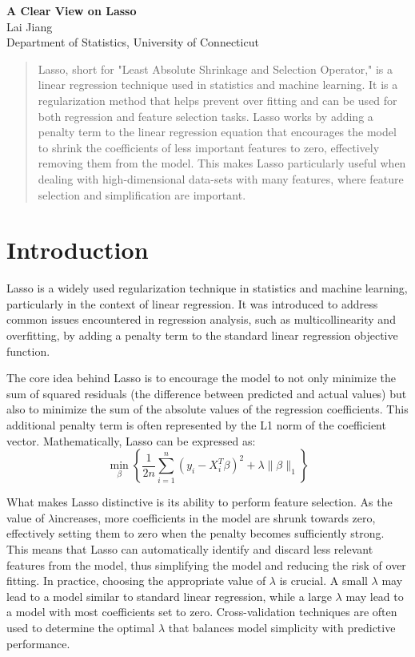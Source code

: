 \documentclass{article}
\newcommand{\greet}[0]{$\lambda$}
\begin{document}
\begin{center}
    \textbf{\large A Clear View on Lasso}\\
    {Lai Jiang} \\ Department of Statistics, University of Connecticut
\end{center}

\begin{abstract}
    Lasso, short for "Least Absolute Shrinkage and Selection Operator," is a linear regression technique used in statistics and machine learning. It is a regularization method that helps prevent over fitting and can be used for both regression and feature selection tasks. Lasso works by adding a penalty term to the linear regression equation that encourages the model to shrink the coefficients of less important features to zero, effectively removing them from the model. This makes Lasso particularly useful when dealing with high-dimensional data-sets with many features, where feature selection and simplification are important.\\
\end{abstract}

\section*{Introduction}
Lasso is a widely used regularization technique in statistics and machine learning, particularly in the context of linear regression. It was introduced to address common issues encountered in regression analysis, such as multicollinearity and overfitting, by adding a penalty term to the standard linear regression objective function.

The core idea behind Lasso is to encourage the model to not only minimize the sum of squared residuals (the difference between predicted and actual values) but also to minimize the sum of the absolute values of the regression coefficients. This additional penalty term is often represented by the L1 norm of the coefficient vector. Mathematically, Lasso can be expressed as:\\\begin{equation}
\min_{\beta} \left\{ \frac{1}{2n} \sum_{i=1}^{n} (y_i - X_i^T \beta)^2 + \lambda \|\beta\|_1 \right\}
\end{equation}

What makes Lasso distinctive is its ability to perform feature selection. As the value of \greet increases, more coefficients in the model are shrunk towards zero, effectively setting them to zero when the penalty becomes sufficiently strong. This means that Lasso can automatically identify and discard less relevant features from the model, thus simplifying the model and reducing the risk of over fitting. In practice, choosing the appropriate value of $\lambda$ is crucial. A small $\lambda$ may lead to a model similar to standard linear regression, while a large $\lambda$ may lead to a model with most coefficients set to zero. Cross-validation techniques are often used to determine the optimal $\lambda$ that balances model simplicity with predictive performance.
\end{document}
